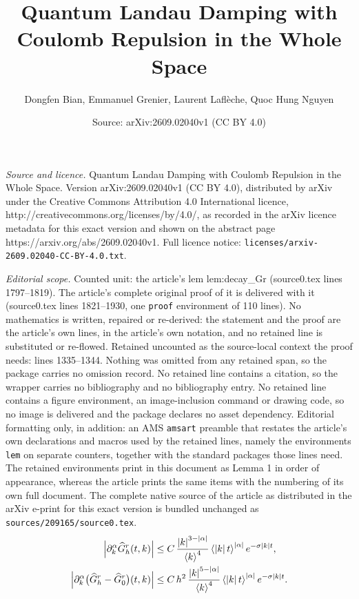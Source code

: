 \documentclass[10pt,a4paper]{amsart}
\title{\Large Quantum Landau Damping with Coulomb Repulsion in the Whole Space}
\author{Dongfen Bian, Emmanuel Grenier, Laurent Lafl\`eche, Quoc Hung Nguyen}
\date{Source: arXiv:2609.02040v1 (CC BY 4.0)}
\newcommand		{\bangle}[1]	{\lt\langle #1\rt\rangle}
\newcommand	{\h}			{h}
\newcommand		{\hatG}			{\widehat{G}}
\newcommand		{\hatGr}		{\hatG^{\textnormal{r}}}
\newcommand		{\lt}			{\left}				%
\newcommand		{\n}[1]			{\lt\lvert{#1}\rt\rvert}	%
\newcommand		{\rt}			{\right}			%
\newcommand		{\weight}[1]	{\bangle{#1}}	%
\begin{document}
\maketitle

\noindent\emph{Source and licence.} \Large Quantum Landau Damping with Coulomb Repulsion in the Whole Space. Version arXiv:2609.02040v1 (CC BY 4.0), distributed by arXiv under the Creative Commons Attribution 4.0 International licence, http://creativecommons.org/licenses/by/4.0/, as recorded in the arXiv licence metadata for this exact version and shown on the abstract page https://arxiv.org/abs/2609.02040v1. Full licence notice: \texttt{licenses/arxiv-2609.02040-CC-BY-4.0.txt}.\par\smallskip

\noindent\textit{Editorial scope.} Counted unit: the article's lem lem:decay\_Gr (source0.tex lines 1797--1819). The article's complete original proof of it is delivered with it (source0.tex lines 1821--1930, one \texttt{proof} environment of 110 lines). No mathematics is written, repaired or re-derived: the statement and the proof are the article's own lines, in the article's own notation, and no retained line is substituted or re-flowed.  Retained uncounted as the source-local context the proof needs: lines 1335--1344.  Nothing was omitted from any retained span, so the package carries no omission record.  No retained line contains a citation, so the wrapper carries no bibliography and no bibliography entry.  No retained line contains a figure environment, an image-inclusion command or drawing code, so no image is delivered and the package declares no asset dependency.  Editorial formatting only, in addition: an AMS \texttt{amsart} preamble that restates the article's own declarations and macros used by the retained lines, namely the environments \texttt{lem} on separate counters, together with the standard packages those lines need.  The retained environments print in this document as Lemma 1 in order of appearance, whereas the article prints the same items with the numbering of its own full document.  The complete native source of the article as distributed in the arXiv e-print for this exact version is bundled unchanged as \texttt{sources/209165/source0.tex}.
		\begin{align}\label{eq:Gr-symbol-derivatives}
			\n{\partial_k^\alpha\hatGr_\h(t,k)}
			&\leq C \, \frac{\n{k}^{3-\n{\alpha}}}{\weight{k}^4}
			\weight{\n{k}t}^{\n{\alpha}}e^{-\sigma\n{k}t},
			\\\label{eq:Gr-difference-symbol-derivatives}
			\n{\partial_k^\alpha
			\bigl(\hatGr_\h-\hatGr_0\bigr)(t,k)}
			&\leq C \, h^2\, \frac{\n{k}^{5-\n{\alpha}}}{\weight{k}^4}
			\weight{\n{k}t}^{\n{\alpha}} e^{-\sigma\n{k}t} .
		\end{align}
\end{document}
